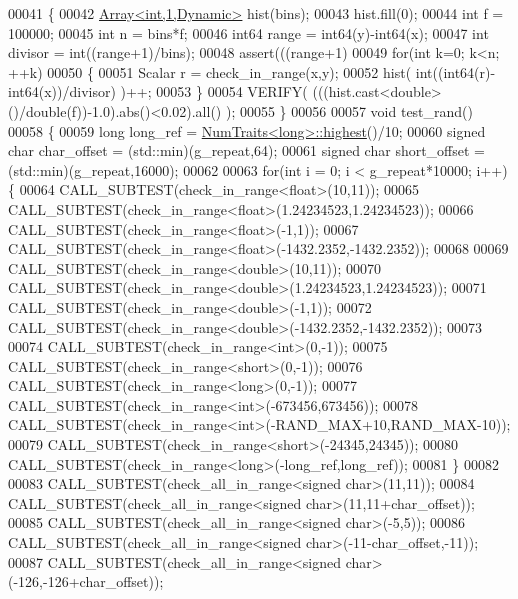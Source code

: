 \begin{DoxyCode}
00041 \{
00042   \hyperlink{group___core___module_class_eigen_1_1_array}{Array<int,1,Dynamic>} hist(bins);
00043   hist.fill(0);
00044   \textcolor{keywordtype}{int} f = 100000;
00045   \textcolor{keywordtype}{int} n = bins*f;
00046   int64 range = int64(y)-int64(x);
00047   \textcolor{keywordtype}{int} divisor = int((range+1)/bins);
00048   assert(((range+1)%
00049   \textcolor{keywordflow}{for}(\textcolor{keywordtype}{int} k=0; k<n; ++k)
00050   \{
00051     Scalar r = check\_in\_range(x,y);
00052     hist( \textcolor{keywordtype}{int}((int64(r)-int64(x))/divisor) )++;
00053   \}
00054   VERIFY( (((hist.cast<\textcolor{keywordtype}{double}>()/\textcolor{keywordtype}{double}(f))-1.0).abs()<0.02).all() );
00055 \}
00056 
00057 \textcolor{keywordtype}{void} test\_rand()
00058 \{
00059   \textcolor{keywordtype}{long} long\_ref = \hyperlink{group___core___module_struct_eigen_1_1_num_traits}{NumTraits<long>::highest}()/10;
00060   \textcolor{keywordtype}{signed} \textcolor{keywordtype}{char} char\_offset = (std::min)(g\_repeat,64);
00061   \textcolor{keywordtype}{signed} \textcolor{keywordtype}{char} short\_offset = (std::min)(g\_repeat,16000);
00062 
00063   \textcolor{keywordflow}{for}(\textcolor{keywordtype}{int} i = 0; i < g\_repeat*10000; i++) \{
00064     CALL\_SUBTEST(check\_in\_range<float>(10,11));
00065     CALL\_SUBTEST(check\_in\_range<float>(1.24234523,1.24234523));
00066     CALL\_SUBTEST(check\_in\_range<float>(-1,1));
00067     CALL\_SUBTEST(check\_in\_range<float>(-1432.2352,-1432.2352));
00068 
00069     CALL\_SUBTEST(check\_in\_range<double>(10,11));
00070     CALL\_SUBTEST(check\_in\_range<double>(1.24234523,1.24234523));
00071     CALL\_SUBTEST(check\_in\_range<double>(-1,1));
00072     CALL\_SUBTEST(check\_in\_range<double>(-1432.2352,-1432.2352));
00073 
00074     CALL\_SUBTEST(check\_in\_range<int>(0,-1));
00075     CALL\_SUBTEST(check\_in\_range<short>(0,-1));
00076     CALL\_SUBTEST(check\_in\_range<long>(0,-1));
00077     CALL\_SUBTEST(check\_in\_range<int>(-673456,673456));
00078     CALL\_SUBTEST(check\_in\_range<int>(-RAND\_MAX+10,RAND\_MAX-10));
00079     CALL\_SUBTEST(check\_in\_range<short>(-24345,24345));
00080     CALL\_SUBTEST(check\_in\_range<long>(-long\_ref,long\_ref));
00081   \}
00082 
00083   CALL\_SUBTEST(check\_all\_in\_range<signed char>(11,11));
00084   CALL\_SUBTEST(check\_all\_in\_range<signed char>(11,11+char\_offset));
00085   CALL\_SUBTEST(check\_all\_in\_range<signed char>(-5,5));
00086   CALL\_SUBTEST(check\_all\_in\_range<signed char>(-11-char\_offset,-11));
00087   CALL\_SUBTEST(check\_all\_in\_range<signed char>(-126,-126+char\_offset));

\end{DoxyCode}
